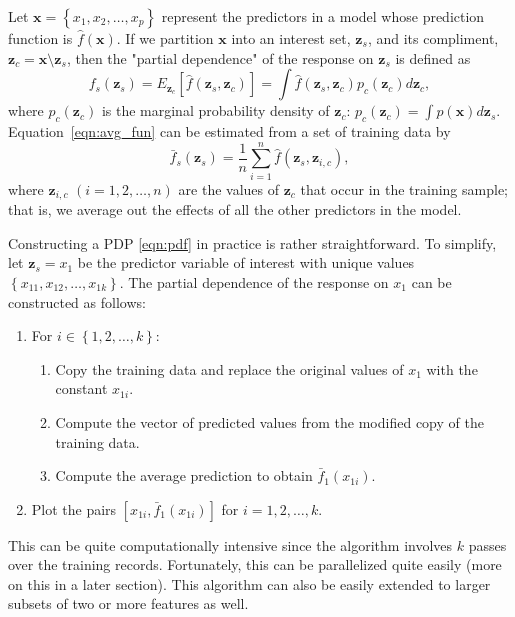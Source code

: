 Let $\boldsymbol{x} = \left\{x_1, x_2, \dots, x_p\right\}$ represent the predictors in a model whose prediction function is $\widehat{f}\left(\boldsymbol{x}\right)$. If we partition $\boldsymbol{x}$ into an interest set, $\boldsymbol{z}_s$, and its compliment, $\boldsymbol{z}_c = \boldsymbol{x} \setminus \boldsymbol{z}_s$, then the "partial dependence" of the response on $\boldsymbol{z}_s$ is defined as
\begin{equation}
\label{eqn:avg_fun}
  f_s\left(\boldsymbol{z}_s\right) = E_{\boldsymbol{z}_c}\left[\widehat{f}\left(\boldsymbol{z}_s, \boldsymbol{z}_c\right)\right] = \int \widehat{f}\left(\boldsymbol{z}_s, \boldsymbol{z}_c\right)p_{c}\left(\boldsymbol{z}_c\right)d\boldsymbol{z}_c,
\end{equation}
where $p_{c}\left(\boldsymbol{z}_c\right)$ is the marginal probability density of $\boldsymbol{z}_c$: $p_{c}\left(\boldsymbol{z}_c\right) = \int p\left(\boldsymbol{x}\right)d\boldsymbol{z}_s$.
Equation~\eqref{eqn:avg_fun} can be estimated from a set of training data by
\begin{equation}
\label{eqn:pdf}
\bar{f}_s\left(\boldsymbol{z}_s\right) = \frac{1}{n}\sum_{i = 1}^n\widehat{f}\left(\boldsymbol{z}_s,\boldsymbol{z}_{i, c}\right),
\end{equation}
where $\boldsymbol{z}_{i, c}$ $\left(i = 1, 2, \dots, n\right)$ are the values of $\boldsymbol{z}_c$ that occur in the training sample; that is, we average out the effects of all the other predictors in the model.

Constructing a PDP \eqref{eqn:pdf} in practice is rather straightforward. To simplify, let $\boldsymbol{z}_s = x_1$ be the predictor variable of interest with unique values $\left\{x_{11}, x_{12}, \dots, x_{1k}\right\}$. The partial dependence of the response on $x_1$ can be constructed as follows:
\begin{enumerate}
  \item For $i \in \left\{1, 2, \dots, k\right\}$:
  \begin{enumerate}
    \item Copy the training data and replace the original values of $x_1$ with the constant $x_{1i}$.
    \item Compute the vector of predicted values from the modified copy of the training data.
    \item Compute the average prediction to obtain $\bar{f}_1\left(x_{1i}\right)$.
  \end{enumerate}
  \item Plot the pairs $\left[x_{1i}, \bar{f}_1\left(x_{1i}\right)\right]$ for $i = 1, 2, \dotsc, k$.
\end{enumerate}
This can be quite computationally intensive since the algorithm involves $k$ passes over the training records. Fortunately, this can be parallelized quite easily (more on this in a later section). This algorithm can also be easily extended to larger subsets of two or more features as well.

